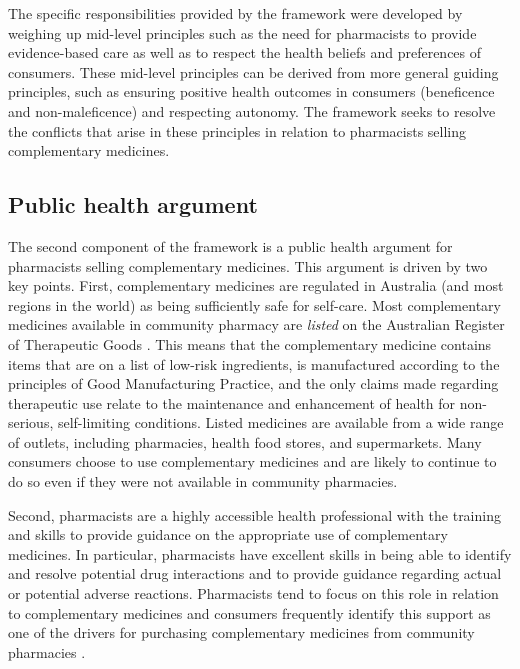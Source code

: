 \documentclass[11pt,a4paper]{article}
\begin{document}
The specific responsibilities provided by the framework were developed
by weighing up mid-level principles such as the need for pharmacists to
provide evidence-based care as well as to respect the health beliefs and
preferences of consumers. These mid-level principles can be derived from
more general guiding principles, such as ensuring positive health
outcomes in consumers (beneficence and non-maleficence) and respecting
autonomy. The framework seeks to resolve the conflicts that arise in
these principles in relation to pharmacists selling complementary
medicines.

\subsection{Public health argument}\label{public-health-argument}

The second component of the framework is a public health argument for
pharmacists selling complementary medicines. This argument is driven by
two key points. First, complementary medicines are regulated in
Australia (and most regions in the world) as being sufficiently safe for
self-care. Most complementary medicines available in community pharmacy
are \emph{listed} on the Australian Register of Therapeutic Goods
\autocite{TGA2019_listed}. This means that the complementary medicine
contains items that are on a list of low-risk ingredients, is
manufactured according to the principles of Good Manufacturing Practice,
and the only claims made regarding therapeutic use relate to the
maintenance and enhancement of health for non-serious, self-limiting
conditions. Listed medicines are available from a wide range of outlets,
including pharmacies, health food stores, and supermarkets. Many
consumers choose to use complementary medicines and are likely to
continue to do so even if they were not available in community
pharmacies.

Second, pharmacists are a highly accessible health professional with the
training and skills to provide guidance on the appropriate use of
complementary medicines. In particular, pharmacists have excellent
skills in being able to identify and resolve potential drug interactions
and to provide guidance regarding actual or potential adverse reactions.
Pharmacists tend to focus on this role in relation to complementary
medicines and consumers frequently identify this support as one of the
drivers for purchasing complementary medicines from community pharmacies
\autocites{Olatunde2010}{Kanjanarach2011}.
\end{document}
